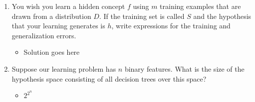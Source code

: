 \documentclass{article}
\begin{document}
\begin{enumerate}
\item You wish you learn a hidden concept $f$ using $m$ training examples that are drawn from a distribution $D$. If the training set is called $S$ and the hypothesis that your learning generates is $h$, write expressions for the training and generalization errors.

	\begin{itemize}
	\item Solution goes here
	\end{itemize}




\item Suppose our learning problem has $n$ binary features. What is the size of the hypothesis space consisting of all decision trees over this space?
	\begin{itemize}
	\item $2^{2^{n}}$
	\end{itemize}

\end{enumerate}
\end{document}
